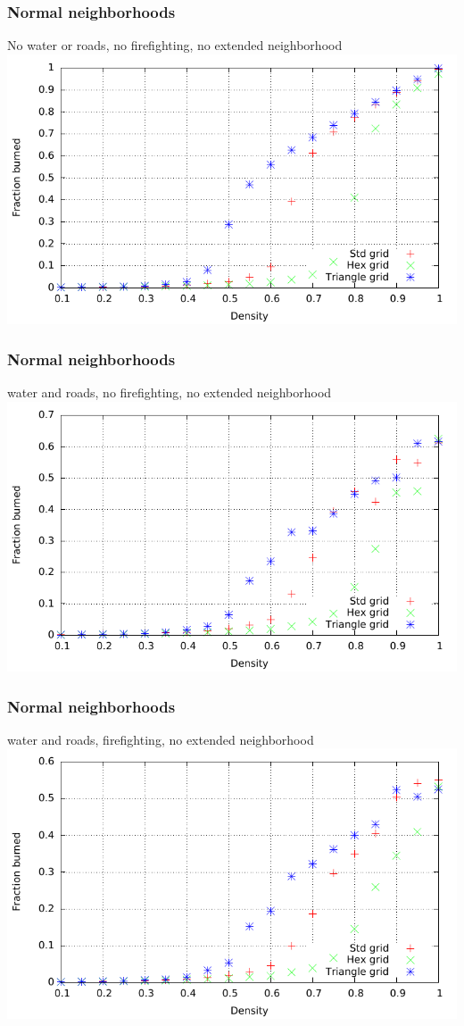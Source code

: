 \documentclass{beamer}
\begin{document}
\begin{frame}
\frametitle{Normal neighborhoods}
No water or roads, no firefighting, no extended neighborhood
\centering
\includegraphics[width=\textwidth]{imgs/plot/ex1/fracburned.pdf}
\end{frame}

\begin{frame}
\frametitle{Normal neighborhoods}
water and roads, no firefighting, no extended neighborhood
\centering
\includegraphics[width=\textwidth]{imgs/plot/ex3/fracburned.pdf}
\end{frame}

\begin{frame}
\frametitle{Normal neighborhoods}
water and roads, firefighting, no extended neighborhood
\centering
\includegraphics[width=\textwidth]{imgs/plot/ex5/fracburned.pdf}
\end{frame}
\end{document}
